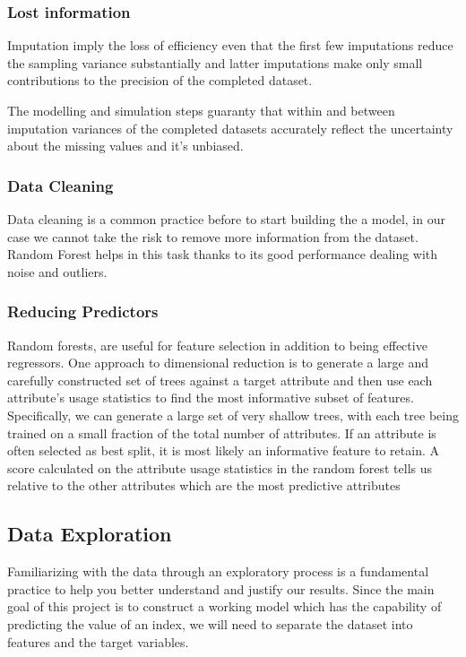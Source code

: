 \documentclass[a4project, twocolumn]{article}
\begin{document}
\subsubsection{Lost information}

Imputation imply the loss of efficiency even that the first few imputations reduce the sampling variance substantially and latter imputations make only small contributions to the precision of the completed dataset.

The modelling and simulation steps guaranty that within and between imputation variances of the completed datasets accurately reflect the uncertainty about the missing values and it's unbiased.

\subsubsection{Data Cleaning}

Data cleaning is a common practice before to start building the a model, in our case we cannot take the risk to remove more information from the dataset. Random Forest helps in this task thanks to its good performance dealing with noise and outliers.
 
\subsubsection{Reducing Predictors}

Random forests, are useful for feature selection in addition to being effective regressors.  One approach to dimensional reduction is to generate a large and carefully constructed set of trees against a target attribute and then use each attribute’s usage statistics to find the most informative subset of features.  Specifically, we can generate a large set of very shallow trees, with each tree being trained on a small fraction of the total number of attributes. If an attribute is often selected as best split, it is most likely an informative feature to retain. A score calculated on the attribute usage statistics in the random forest tells us relative to the other attributes which are the most predictive attributes

\subsection{Data Exploration}

Familiarizing with the data through an exploratory process is a fundamental practice to help you better understand and justify our results. Since the main goal of this project is to construct a working model which has the capability of predicting the value of an index, we will need to separate the dataset into features and the target variables.
\end{document}
